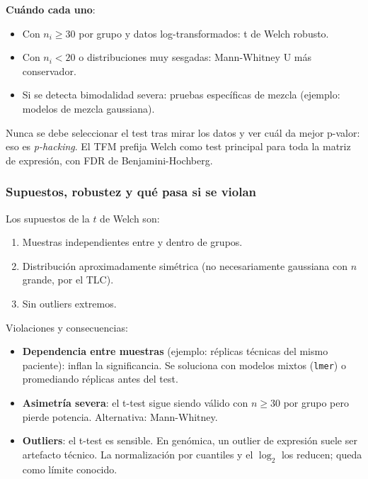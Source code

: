 \documentclass[11pt, a4paper]{article}
\begin{document}
\textbf{Cu\'ando cada uno}:

\begin{itemize}[leftmargin=1.2em]
  \item Con $n_i \geq 30$ por grupo y datos log-transformados: t de Welch
  robusto.
  \item Con $n_i < 20$ o distribuciones muy sesgadas: Mann-Whitney U
  m\'as conservador.
  \item Si se detecta bimodalidad severa: pruebas espec\'ificas de mezcla
  (ejemplo: modelos de mezcla gaussiana).
\end{itemize}

\begin{peligro}
Nunca se debe seleccionar el test tras mirar los datos y ver cu\'al da
mejor p-valor: eso es \emph{p-hacking}. El TFM prefija Welch como test
principal para toda la matriz de expresi\'on, con FDR de Benjamini-Hochberg.
\end{peligro}

\subsubsection*{Supuestos, robustez y qu\'e pasa si se violan}

Los supuestos de la $t$ de Welch son:
\begin{enumerate}[leftmargin=1.4em]
  \item Muestras independientes entre y dentro de grupos.
  \item Distribuci\'on aproximadamente sim\'etrica (no necesariamente
  gaussiana con $n$ grande, por el TLC).
  \item Sin outliers extremos.
\end{enumerate}

Violaciones y consecuencias:
\begin{itemize}[leftmargin=1.2em]
  \item \textbf{Dependencia entre muestras} (ejemplo: r\'eplicas t\'ecnicas
  del mismo paciente): inflan la significancia. Se soluciona con modelos
  mixtos (\texttt{lmer}) o promediando r\'eplicas antes del test.
  \item \textbf{Asimetr\'ia severa}: el t-test sigue siendo v\'alido con
  $n \geq 30$ por grupo pero pierde potencia. Alternativa: Mann-Whitney.
  \item \textbf{Outliers}: el t-test es sensible. En gen\'omica, un
  outlier de expresi\'on suele ser artefacto t\'ecnico. La normalizaci\'on
  por cuantiles y el $\log_2$ los reducen; queda como l\'imite conocido.
\end{itemize}
\end{document}
